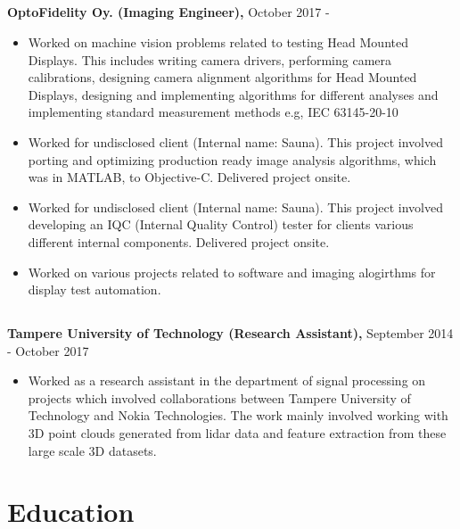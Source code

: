 \documentclass{article}
\begin{document}
\subsection{}
\textbf{OptoFidelity Oy. (Imaging Engineer),} October 2017 -
\begin{itemize}[label={--}]
  \itemsep0em 

  \item Worked on machine vision problems related to testing Head Mounted
    Displays.  This includes writing camera drivers, performing camera
    calibrations, designing camera alignment algorithms for Head Mounted
    Displays, designing and implementing algorithms for different analyses and
    implementing standard measurement methods e.g, IEC 63145-20-10

  \item Worked for undisclosed client (Internal name: Sauna). This project
    involved porting and optimizing production ready image analysis algorithms,
    which was in MATLAB, to Objective-C. Delivered project onsite.

  \item Worked for undisclosed client (Internal name: Sauna). This project
    involved developing an IQC (Internal Quality Control) tester for clients
    various different internal components.  Delivered project onsite.

  \item Worked on various projects related to software and imaging alogirthms
    for display test automation.

\end{itemize}

\subsection{}
\textbf{Tampere University of Technology (Research Assistant),} September 2014 -
  October 2017
\begin{itemize}[label={--}]
  \itemsep0em 

  \item Worked as a research assistant in the department of signal processing
    on projects which involved collaborations between Tampere University of
    Technology and Nokia Technologies.  The work mainly involved working with
    3D point clouds generated from lidar data and feature extraction from these
    large scale 3D datasets.
\end{itemize}

\section{Education}
\end{document}
